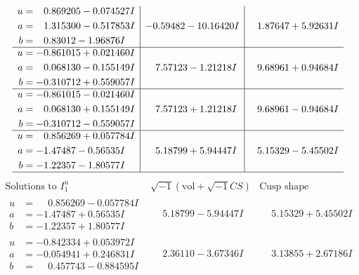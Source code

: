 \documentclass[1p]{elsarticle_modified}
\theoremstyle{definition}
\newcommand{\I}{\sqrt{-1}}
\begin{document}
$$\begin{array}{c|c|c}
\begin{aligned}
u &= \phantom{-}0.869205 - 0.074527 I \\
a &= \phantom{-}1.315300 - 0.517853 I \\
b &= \phantom{-}0.83012 - 1.96876 I\end{aligned}
 & -0.59482 - 10.16420 I & \phantom{-}1.87647 + 5.92631 I \\ \hline\begin{aligned}
u &= -0.861015 + 0.021460 I \\
a &= \phantom{-}0.068130 - 0.155149 I \\
b &= -0.310712 + 0.559057 I\end{aligned}
 & \phantom{-}7.57123 - 1.21218 I & \phantom{-}9.68961 + 0.94684 I \\ \hline\begin{aligned}
u &= -0.861015 - 0.021460 I \\
a &= \phantom{-}0.068130 + 0.155149 I \\
b &= -0.310712 - 0.559057 I\end{aligned}
 & \phantom{-}7.57123 + 1.21218 I & \phantom{-}9.68961 - 0.94684 I \\ \hline\begin{aligned}
u &= \phantom{-}0.856269 + 0.057784 I \\
a &= -1.47487 - 0.56535 I \\
b &= -1.22357 - 1.80577 I\end{aligned}
 & \phantom{-}5.18799 + 5.94447 I & \phantom{-}5.15329 - 5.45502 I\\
 \hline 
 \end{array}$$\newpage$$\begin{array}{c|c|c}  
\text{Solutions to }I^u_{1}& \I (\text{vol} + \sqrt{-1}CS) & \text{Cusp shape}\\
 \hline 
\begin{aligned}
u &= \phantom{-}0.856269 - 0.057784 I \\
a &= -1.47487 + 0.56535 I \\
b &= -1.22357 + 1.80577 I\end{aligned}
 & \phantom{-}5.18799 - 5.94447 I & \phantom{-}5.15329 + 5.45502 I \\ \hline\begin{aligned}
u &= -0.842334 + 0.053972 I \\
a &= -0.054941 + 0.246831 I \\
b &= \phantom{-}0.457743 - 0.884595 I\end{aligned}
 & \phantom{-}2.36110 - 3.67346 I & \phantom{-}3.13855 + 2.67186 I \\ \hline\begin{aligned}

\end{aligned}
\end{array}$$
\end{document}
